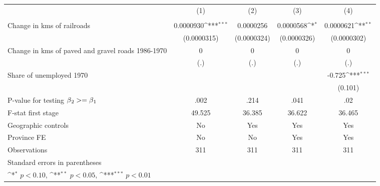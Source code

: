 {
\def\sym#1{\ifmmode^{#1}\else\(^{#1}\)\fi}
\begin{tabular}{l*{4}{c}}
\hline\hline
                &\multicolumn{1}{c}{(1)}&\multicolumn{1}{c}{(2)}&\multicolumn{1}{c}{(3)}&\multicolumn{1}{c}{(4)}\\
                &\multicolumn{1}{c}{}&\multicolumn{1}{c}{}&\multicolumn{1}{c}{}&\multicolumn{1}{c}{}\\
\hline
Change in kms of railroads&0.0000930\sym{***}&0.0000256         &0.0000568\sym{*}  &0.0000621\sym{**} \\
                &(0.0000315)         &(0.0000324)         &(0.0000326)         &(0.0000302)         \\
[1em]
Change in kms of paved and gravel roads 1986-1970&        0         &        0         &        0         &        0         \\
                &      (.)         &      (.)         &      (.)         &      (.)         \\
[1em]
Share of unemployed 1970&                  &                  &                  &   -0.725\sym{***}\\
                &                  &                  &                  &  (0.101)         \\
\hline
P-value for testing $\beta\\_2 >= \beta\\_1$&     .002         &     .214         &     .041         &      .02         \\
F-stat first stage&   49.525         &   36.385         &   36.622         &   36.465         \\
Geographic controls&       No         &      Yes         &      Yes         &      Yes         \\
Province FE     &       No         &       No         &      Yes         &      Yes         \\
Observations    &      311         &      311         &      311         &      311         \\
\hline\hline
\multicolumn{5}{l}{\footnotesize Standard errors in parentheses}\\
\multicolumn{5}{l}{\footnotesize \sym{*} \(p<0.10\), \sym{**} \(p<0.05\), \sym{***} \(p<0.01\)}\\
\end{tabular}
}
